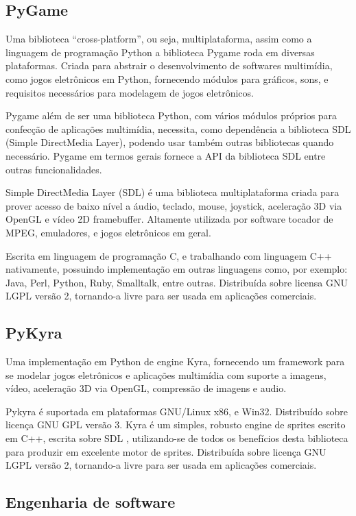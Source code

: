 \subsection{PyGame}

Uma biblioteca “cross-platform”, ou seja, multiplataforma, assim como a linguagem de programação Python a biblioteca Pygame roda em diversas plataformas. Criada para abstrair o desenvolvimento de softwares multimídia, como jogos eletrônicos em Python, fornecendo módulos para gráficos, sons, e requisitos necessários para modelagem de jogos eletrônicos.

Pygame além de ser uma biblioteca Python, com vários módulos próprios para confecção de aplicações multimídia, necessita, como dependência a biblioteca SDL (Simple DirectMedia Layer), podendo usar também outras bibliotecas quando necessário. Pygame em termos gerais fornece a API da biblioteca SDL entre outras funcionalidades.

Simple DirectMedia Layer (SDL) é uma biblioteca multiplataforma criada para prover acesso de baixo nível a áudio, teclado, mouse, joystick, aceleração 3D via OpenGL e vídeo 2D framebuffer. Altamente utilizada por software tocador de MPEG, emuladores, e jogos eletrônicos em geral.

Escrita em linguagem de programação C, e trabalhando com linguagem C++ nativamente, possuindo implementação em outras linguagens como, por exemplo: Java, Perl, Python, Ruby, Smalltalk, entre outras. Distribuída sobre licensa GNU LGPL versão 2, tornando-a livre para ser usada em aplicações comerciais.

\subsection{PyKyra}
	
Uma implementação em Python de engine Kyra, fornecendo um framework para se modelar jogos eletrônicos e aplicações multimídia com suporte a imagens, vídeo, aceleração 3D via OpenGL, compressão de imagens e audio.

Pykyra é suportada em plataformas GNU/Linux x86, e Win32. Distribuído sobre licença GNU GPL versão 3. Kyra é um simples, robusto engine de sprites escrito em C++, escrita sobre SDL , utilizando-se de todos os benefícios desta biblioteca para produzir em excelente motor de sprites. Distribuída sobre licença GNU LGPL versão 2, tornando-a livre para ser usada em aplicações comerciais. 


\subsection{Engenharia de software}

